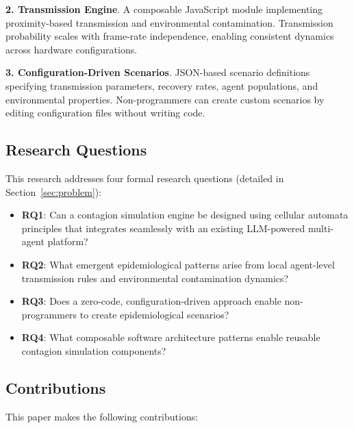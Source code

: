 \textbf{2. Transmission Engine}. A composable JavaScript module implementing proximity-based transmission and environmental contamination. Transmission probability scales with frame-rate independence, enabling consistent dynamics across hardware configurations.

\textbf{3. Configuration-Driven Scenarios}. JSON-based scenario definitions specifying transmission parameters, recovery rates, agent populations, and environmental properties. Non-programmers can create custom scenarios by editing configuration files without writing code.

\subsection{Research Questions}

This research addresses four formal research questions (detailed in Section~\ref{sec:problem}):

\begin{itemize}
    \item \textbf{RQ1}: Can a contagion simulation engine be designed using cellular automata principles that integrates seamlessly with an existing LLM-powered multi-agent platform?
    \item \textbf{RQ2}: What emergent epidemiological patterns arise from local agent-level transmission rules and environmental contamination dynamics?
    \item \textbf{RQ3}: Does a zero-code, configuration-driven approach enable non-programmers to create epidemiological scenarios?
    \item \textbf{RQ4}: What composable software architecture patterns enable reusable contagion simulation components?
\end{itemize}

\subsection{Contributions}

This paper makes the following contributions:

